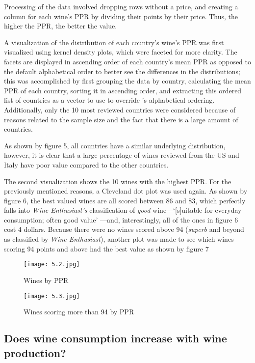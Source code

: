 Processing of the data involved dropping rows without a price, and creating a column for each wine's PPR by dividing their points by their price. Thus, the higher the PPR, the better the value.

A visualization of the distribution of each country's wine's PPR was first visualized using kernel density plots, which were faceted for more clarity. The facets are displayed in ascending order of each country's mean PPR as opposed to the default alphabetical order to better see the differences in the distributions; this was accomplished by first grouping the data by country, calculating the mean PPR of each country, sorting it in ascending order, and extracting this ordered list of countries as a vector to use to override 's alphabetical ordering. Additionally, only the 10 most reviewed countries were considered because of reasons related to the sample size and the fact that there is a large amount of countries.

As shown by figure 5, all countries have a similar underlying distribution, however, it is clear that a large percentage of wines reviewed from the US and Italy have poor value compared to the other countries.

The second visualization shows the 10 wines with the highest PPR. For the previously mentioned reasons, a Cleveland dot plot was used again. As shown by figure 6, the best valued wines are all scored between 86 and 83, which perfectly falls into \emph{Wine Enthusiast's} classification of \emph{good} wine---`[s]uitable for everyday consumption; often good value' \cite{WineMag}---and, interestingly, all of the ones in figure 6 cost 4 dollars. Because there were no wines scored above 94 (\emph{superb} and beyond as classified by \emph{Wine Enthusiast}), another plot was made to see which wines scoring 94 points and above had the best value as shown by figure 7

\begin{figure}[h]
  \texttt{[image: 5.2.jpg]}
  \caption{Wines by PPR}
\end{figure}

\begin{figure}[h]
  \texttt{[image: 5.3.jpg]}
  \caption{Wines scoring more than 94 by PPR}
\end{figure}

\subsection{Does wine consumption increase with wine production?}

